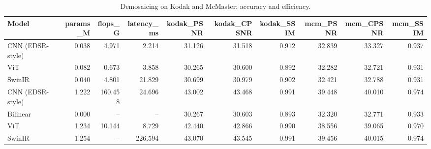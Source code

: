 \begin{table}[t]
\centering
\small
\caption{Demosaicing on Kodak and McMaster: accuracy and efficiency.}
\label{tab:main}
\begin{tabular}{lrrrrrrrrr}
\toprule
Model & params\_M & flops\_G & latency\_ms & kodak\_PSNR & kodak\_CPSNR & kodak\_SSIM & mcm\_PSNR & mcm\_CPSNR & mcm\_SSIM \\
\midrule
CNN (EDSR-style) & 0.038 & 4.971 & 2.214 & 31.126 & 31.518 & 0.912 & 32.839 & 33.327 & 0.937 \\
ViT & 0.082 & 0.673 & 3.858 & 30.265 & 30.600 & 0.892 & 32.282 & 32.721 & 0.931 \\
SwinIR & 0.040 & 4.801 & 21.829 & 30.699 & 30.979 & 0.902 & 32.421 & 32.788 & 0.931 \\
CNN (EDSR-style) & 1.222 & 160.458 & 24.696 & 43.002 & 43.468 & 0.991 & 39.448 & 40.010 & 0.974 \\
Bilinear & 0.000 & -- & -- & 30.267 & 30.603 & 0.893 & 32.320 & 32.771 & 0.933 \\
ViT & 1.234 & 10.144 & 8.729 & 42.440 & 42.866 & 0.990 & 38.556 & 39.065 & 0.970 \\
SwinIR & 1.254 & -- & 226.594 & 43.070 & 43.545 & 0.991 & 39.456 & 40.015 & 0.974 \\
\bottomrule
\end{tabular}
\end{table}
